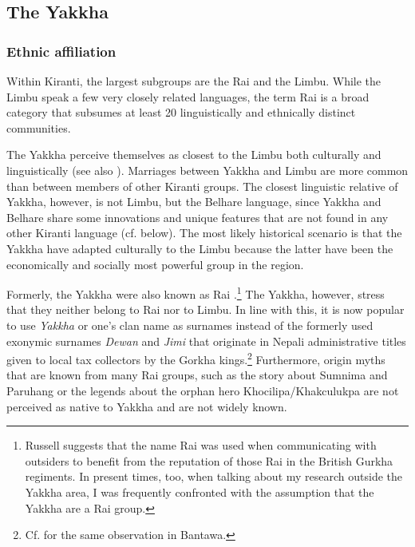 \subsection{The Yakkha}

\subsubsection{Ethnic affiliation}

Within Kiranti, the largest subgroups are the Rai and the Limbu. While the Limbu speak a few very closely related languages, the term Rai is a broad category that subsumes at least 20 linguistically and ethnically distinct communities.  

The Yakkha perceive themselves as closest to the Limbu both culturally and linguistically (see also \citet[90]{Russell1992_Yakha}). Marriages between Yakkha and Limbu are more common than between members of other Kiranti groups. The closest linguistic relative of Yakkha, however, is not Limbu, but the Belhare language, since Yakkha and Belhare share some innovations and unique features that are not found in any other Kiranti language (cf.  below). The most likely historical scenario is that the Yakkha have adapted culturally to the Limbu because the latter have been  the economically and socially most powerful group in the region. 

Formerly, the Yakkha were also known as Rai \citep[90]{Russell1992_Yakha}.\footnote{Russell suggests that the name Rai was used when communicating with outsiders to benefit from the reputation of those Rai in the British Gurkha regiments. In present times, too, when talking about my research outside the Yakkha area, I was frequently confronted with the assumption that the Yakkha are a Rai group.}  The Yakkha, however, stress that they neither belong to Rai nor to Limbu. In line with this, it is now popular to use \emph{Yakkha} or one's  clan name as surnames instead of the formerly used exonymic surnames \emph{Dewan} and \emph{Jimi} that originate in Nepali administrative titles given to local tax collectors by the Gorkha kings.\footnote{Cf. \citet[8]{Doornenbal2009A-grammar} for the same observation in Bantawa.} Furthermore,  origin myths that are known from many Rai groups, such as the story about Sumnima and Paruhang or the legends about the orphan hero Khocilipa/Khakculukpa \citep{Ebert2003Camling, Gaenszle2000Origins} are not perceived as native to Yakkha and are not widely known. 

